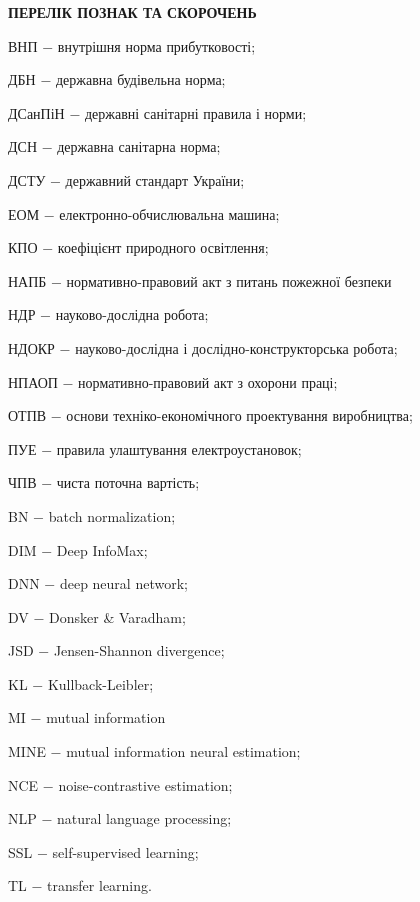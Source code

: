 
\begin{center}
\textbf{ПЕРЕЛІК ПОЗНАК ТА СКОРОЧЕНЬ}
\end{center}



ВНП $-$ внутрішня норма прибутковості;

ДБН $-$ державна будівельна норма;

ДСанПіН $-$ державні санітарні правила і норми;

ДСН $-$ державна санітарна норма;

ДСТУ $-$ державний стандарт України;

ЕОМ $-$ електронно-обчислювальна машина;

КПО $-$ коефіцієнт природного освітлення;

НАПБ $-$ нормативно-правовий акт з питань пожежної безпеки

НДР $-$ науково-дослідна робота;

НДОКР $-$ науково-дослідна і дослідно-конструкторська робота;

НПАОП $-$ нормативно-правовий акт з охорони праці;

ОТПВ $-$ основи техніко-економічного проектування виробництва;

ПУЕ $-$ правила улаштування електроустановок;

ЧПВ $-$ чиста поточна вартість;


BN $-$ batch normalization;

DIM $-$ Deep InfoMax;

DNN $-$ deep neural network;

DV $-$ Donsker \& Varadham;

JSD $-$ Jensen-Shannon divergence;

KL $-$ Kullback-Leibler;

MI $-$ mutual information

MINE $-$ mutual information neural estimation;

NCE $-$ noise-contrastive estimation;

NLP $-$ natural language processing;

SSL $-$ self-supervised learning;

TL $-$ transfer learning.
